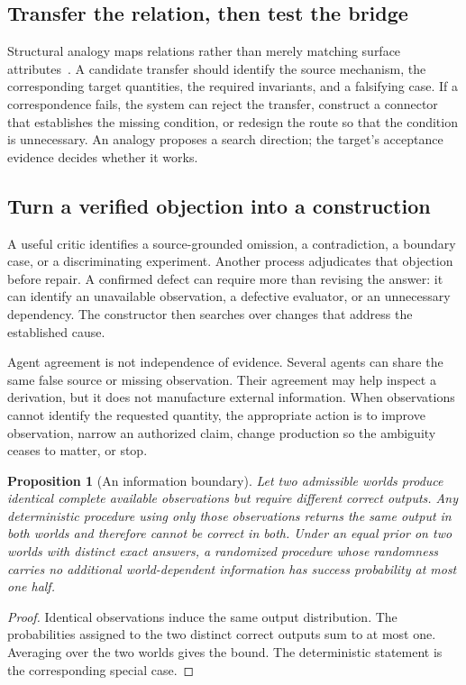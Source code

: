 \documentclass[10pt,a4paper]{article}
\newtheorem{proposition}{Proposition}
\begin{document}
\subsection{Transfer the relation, then test the bridge}

Structural analogy maps relations rather than merely matching surface attributes~\citep{gentner}. A candidate transfer should identify the source mechanism, the corresponding target quantities, the required invariants, and a falsifying case. If a correspondence fails, the system can reject the transfer, construct a connector that establishes the missing condition, or redesign the route so that the condition is unnecessary. An analogy proposes a search direction; the target's acceptance evidence decides whether it works.

\subsection{Turn a verified objection into a construction}

A useful critic identifies a source-grounded omission, a contradiction, a boundary case, or a discriminating experiment. Another process adjudicates that objection before repair. A confirmed defect can require more than revising the answer: it can identify an unavailable observation, a defective evaluator, or an unnecessary dependency. The constructor then searches over changes that address the established cause.

Agent agreement is not independence of evidence. Several agents can share the same false source or missing observation. Their agreement may help inspect a derivation, but it does not manufacture external information. When observations cannot identify the requested quantity, the appropriate action is to improve observation, narrow an authorized claim, change production so the ambiguity ceases to matter, or stop.

\begin{samepage}
\begin{proposition}[An information boundary]\label{prop:information}
Let two admissible worlds produce identical complete available observations but require different correct outputs. Any deterministic procedure using only those observations returns the same output in both worlds and therefore cannot be correct in both. Under an equal prior on two worlds with distinct exact answers, a randomized procedure whose randomness carries no additional world-dependent information has success probability at most one half.
\end{proposition}
\begin{proof}
Identical observations induce the same output distribution. The probabilities assigned to the two distinct correct outputs sum to at most one. Averaging over the two worlds gives the bound. The deterministic statement is the corresponding special case.
\end{proof}
\end{samepage}
\end{document}
